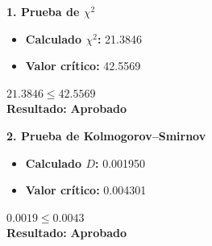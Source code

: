 \noindent
\begin{minipage}[t]{0.48\textwidth}
    \textbf{1. Prueba de \(\chi^2\)}
    \vspace{0.3cm}
    \begin{itemize}[itemsep=0.4em]
        \item \textbf{Calculado \(\chi^2\):} 21.3846
        \item \textbf{Valor crítico:} 42.5569
    \end{itemize}

    \begin{center}
        \vspace{0.5cm}
        \(21.3846 \leq 42.5569\)
        \vspace{0.1cm}
        \\\textbf{Resultado: }
        \textcolor{green!60!black}{\textbf{Aprobado}}
    \end{center}

    \vspace{0.8cm}

    \textbf{2. Prueba de Kolmogorov--Smirnov}
    \vspace{0.3cm}
    \begin{itemize}[itemsep=0.4em]
        \item \textbf{Calculado \(D\):} 0.001950
        \item \textbf{Valor crítico:} 0.004301
    \end{itemize}
    \begin{center}
        \vspace{0.5cm}
        \(0.0019 \leq 0.0043\)
        \vspace{0.1cm}
        \\\textbf{Resultado: }
        \textcolor{green!60!black}{\textbf{Aprobado}}
    \end{center}

\end{minipage}
\hfill
